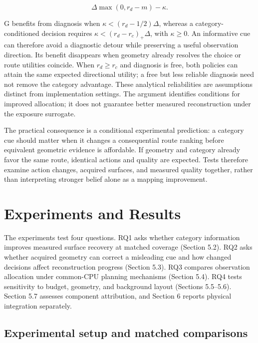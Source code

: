 \documentclass[11pt,a4paper]{article}
\providecommand{\hypertarget}[2]{#2}
\begin{document}
\[
\Delta\max(0,r_d-m)-\kappa.
\]

G benefits from diagnosis when \(\kappa<(r_d-1/2)\Delta\), whereas a category-conditioned decision requires \(\kappa<(r_d-r_c)_+\Delta\), with \(\kappa\ge0\). An informative cue can therefore avoid a diagnostic detour while preserving a useful observation direction. Its benefit disappears when geometry already resolves the choice or route utilities coincide. When \(r_d\ge r_c\) and diagnosis is free, both policies can attain the same expected directional utility; a free but less reliable diagnosis need not remove the category advantage. These analytical reliabilities are assumptions distinct from implementation settings. The argument identifies conditions for improved allocation; it does not guarantee better measured reconstruction under the exposure surrogate.

The practical consequence is a conditional experimental prediction: a category cue should matter when it changes a consequential route ranking before equivalent geometric evidence is affordable. If geometry and category already favor the same route, identical actions and quality are expected. Tests therefore examine action changes, acquired surfaces, and measured quality together, rather than interpreting stronger belief alone as a mapping improvement.

\hypertarget{experiments-and-results}{%
\section{Experiments and Results}\label{experiments-and-results}}

The experiments test four questions. RQ1 asks whether category information improves measured surface recovery at matched coverage (Section 5.2). RQ2 asks whether acquired geometry can correct a misleading cue and how changed decisions affect reconstruction progress (Section 5.3). RQ3 compares observation allocation under common-CPU planning mechanisms (Section 5.4). RQ4 tests sensitivity to budget, geometry, and background layout (Sections 5.5--5.6). Section 5.7 assesses component attribution, and Section 6 reports physical integration separately.

\hypertarget{experimental-setup-and-matched-comparisons}{%
\subsection{Experimental setup and matched comparisons}\label{experimental-setup-and-matched-comparisons}}
\end{document}
